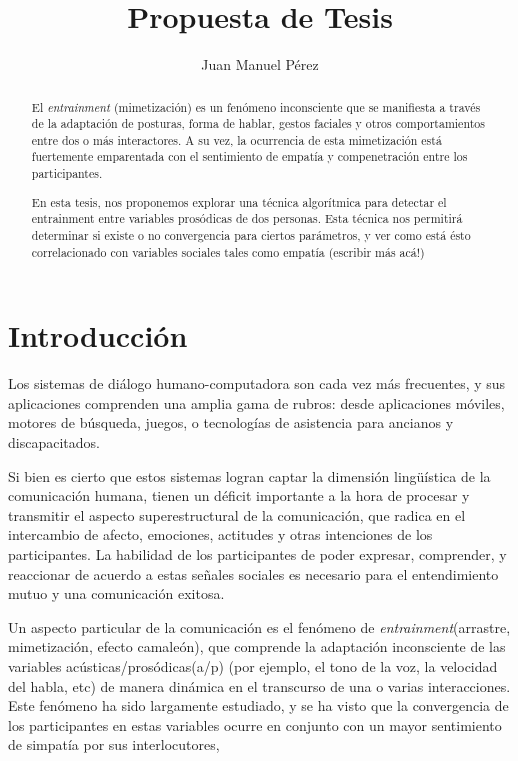\documentclass[a4paper,11pt]{article}
\title{Propuesta de Tesis}
\author{Juan Manuel Pérez}
\begin{document}
\maketitle

\begin{abstract}

El \emph{entrainment} (mimetización) es un fenómeno inconsciente que se manifiesta a través de la adaptación de posturas, forma de hablar, gestos faciales y otros comportamientos entre dos o más interactores. A su vez, la ocurrencia de esta mimetización está fuertemente emparentada con el sentimiento de empatía y compenetración entre los participantes.
 
En esta tesis, nos proponemos explorar una técnica algorítmica para detectar el entrainment entre variables prosódicas de dos personas. Esta técnica nos permitirá determinar si existe o no convergencia para ciertos parámetros, y ver como está ésto correlacionado con variables sociales tales como empatía (escribir más acá!)


\end{abstract}


\section{Introducción}

Los sistemas de diálogo humano-computadora son cada vez más frecuentes, y sus aplicaciones comprenden una 
amplia gama de rubros: desde aplicaciones móviles, motores de búsqueda, juegos, o tecnologías de asistencia para 
ancianos y discapacitados.

Si bien es cierto que estos sistemas logran captar la dimensión lingüística de la comunicación humana, tienen un déficit
importante a la hora de procesar y transmitir el aspecto superestructural de la comunicación, que radica en el intercambio
de afecto, emociones, actitudes y otras intenciones de los participantes. La habilidad de los participantes de poder 
expresar, comprender, y reaccionar de acuerdo a estas señales sociales es necesario para el entendimiento mutuo y una
comunicación exitosa.
 
Un aspecto particular de la comunicación es el fenómeno de \emph{entrainment}(arrastre, mimetización, efecto camaleón), que
comprende la adaptación inconsciente de las variables acústicas/prosódicas(a/p) (por ejemplo, el tono de la voz, la velocidad del habla, etc) de manera dinámica en el transcurso de una o varias interacciones. Este fenómeno ha sido largamente estudiado, y se ha visto que la convergencia de los participantes en estas variables ocurre en conjunto con un mayor sentimiento de simpatía por sus interlocutores, 
\end{document}
